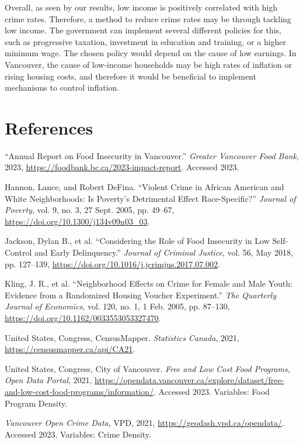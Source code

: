 \documentclass[AEJ]{AEA}
\begin{document}
Overall, as seen by our results, low income is positively correlated with high crime rates. Therefore, a method to reduce crime rates may be through tackling low income. The government can implement several different policies for this, such as progressive taxation, investment in education and training, or a higher minimum wage. The chosen policy would depend on the cause of low earnings. In Vancouver, the cause of low-income households may be high rates of inflation or rising housing costs, and therefore it would be beneficial to implement mechanisms to control inflation.


\section{References}

“Annual Report on Food Insecurity in Vancouver.” \textit{Greater Vancouver Food Bank}, 2023, \url{https://foodbank.bc.ca/2023-impact-report}. Accessed 2023.

Hannon, Lance, and Robert DeFina. “Violent Crime in African American and White Neighborhoods: Is Poverty’s Detrimental Effect Race-Specific?” \textit{Journal of Poverty}, vol. 9, no. 3, 27 Sept. 2005, pp. 49--67, \url{https://doi.org/10.1300/j134v09n03_03}.

Jackson, Dylan B., et al. “Considering the Role of Food Insecurity in Low Self-Control and Early Delinquency.” \textit{Journal of Criminal Justice}, vol. 56, May 2018, pp. 127--139, \url{https://doi.org/10.1016/j.jcrimjus.2017.07.002}.

Kling, J. R., et al. “Neighborhood Effects on Crime for Female and Male Youth: Evidence from a Randomized Housing Voucher Experiment.” \textit{The Quarterly Journal of Economics}, vol. 120, no. 1, 1 Feb. 2005, pp. 87--130, \url{https://doi.org/10.1162/0033553053327470}.

United States, Congress, CensusMapper. \textit{Statistics Canada}, 2021, \url{https://censusmapper.ca/api/CA21}.

United States, Congress, City of Vancouver. \textit{Free and Low Cost Food Programs, Open Data Portal}, 2021, \url{https://opendata.vancouver.ca/explore/dataset/free-and-low-cost-food-programs/information/}. Accessed 2023. Variables: Food Program Density.

\textit{Vancouver Open Crime Data}, VPD, 2021, \url{https://geodash.vpd.ca/opendata/}. Accessed 2023. Variables: Crime Density.
\end{document}
